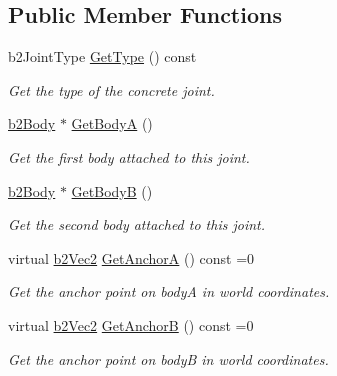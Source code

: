 \subsection*{Public Member Functions}
\begin{DoxyCompactItemize}
\item 
\mbox{\label{classb2Joint_ac56eef62fe1ac7c9e5e21a79fb035255}} 
b2\+Joint\+Type \hyperlink{classb2Joint_ac56eef62fe1ac7c9e5e21a79fb035255}{Get\+Type} () const
\begin{DoxyCompactList}\small\item\em Get the type of the concrete joint. \end{DoxyCompactList}\item 
\mbox{\label{classb2Joint_a2ed5eca3dbdce48665c14452b280613f}} 
\hyperlink{classb2Body}{b2\+Body} $\ast$ \hyperlink{classb2Joint_a2ed5eca3dbdce48665c14452b280613f}{Get\+BodyA} ()
\begin{DoxyCompactList}\small\item\em Get the first body attached to this joint. \end{DoxyCompactList}\item 
\mbox{\label{classb2Joint_a700b3d4c87f34f456151b9598e4641a0}} 
\hyperlink{classb2Body}{b2\+Body} $\ast$ \hyperlink{classb2Joint_a700b3d4c87f34f456151b9598e4641a0}{Get\+BodyB} ()
\begin{DoxyCompactList}\small\item\em Get the second body attached to this joint. \end{DoxyCompactList}\item 
\mbox{\label{classb2Joint_abe46ca3aad5db73909a9b5a7b2117447}} 
virtual \hyperlink{structb2Vec2}{b2\+Vec2} \hyperlink{classb2Joint_abe46ca3aad5db73909a9b5a7b2117447}{Get\+AnchorA} () const =0
\begin{DoxyCompactList}\small\item\em Get the anchor point on bodyA in world coordinates. \end{DoxyCompactList}\item 
\mbox{\label{classb2Joint_a88e947c65d4ea26fe539f02a8cb7f7a9}} 
virtual \hyperlink{structb2Vec2}{b2\+Vec2} \hyperlink{classb2Joint_a88e947c65d4ea26fe539f02a8cb7f7a9}{Get\+AnchorB} () const =0
\begin{DoxyCompactList}\small\item\em Get the anchor point on bodyB in world coordinates. \end{DoxyCompactList}\item 

\end{DoxyCompactItemize}
